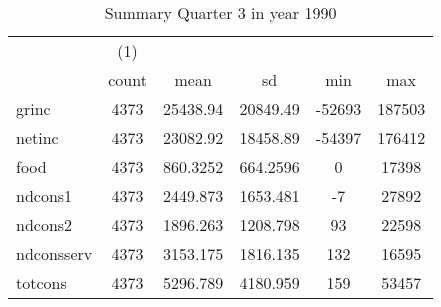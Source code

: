 \begin{table}[htbp]\centering
\def\sym#1{\ifmmode^{#1}\else\(^{#1}\)\fi}
\caption{Summary Quarter 3 in year 1990 \label{sum\_Q3\_y1990}}
\begin{tabular}{l*{1}{ccccc}}
\hline\hline
            &\multicolumn{1}{c}{(1)}&            &            &            &            \\
            &       count&        mean&          sd&         min&         max\\
\hline
grinc       &        4373&    25438.94&    20849.49&      -52693&      187503\\
netinc      &        4373&    23082.92&    18458.89&      -54397&      176412\\
food        &        4373&    860.3252&    664.2596&           0&       17398\\
ndcons1     &        4373&    2449.873&    1653.481&          -7&       27892\\
ndcons2     &        4373&    1896.263&    1208.798&          93&       22598\\
ndconsserv  &        4373&    3153.175&    1816.135&         132&       16595\\
totcons     &        4373&    5296.789&    4180.959&         159&       53457\\
\hline\hline
\end{tabular}
\end{table}
